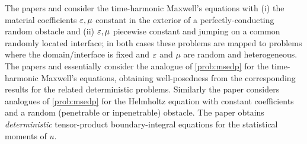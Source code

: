 The papers \cite{JeScZe:17} and \cite{JeSc:16} consider the time-harmonic Maxwell's equations with (i) the material coefficients $\varepsilon,\mu$ constant in the exterior of a perfectly-conducting random obstacle and (ii) $\varepsilon,\mu$ piecewise constant and jumping on a common randomly located interface; in both cases these problems are mapped to problems where the domain/interface is fixed and $\varepsilon$ and $\mu$ are random and heterogeneous. The papers \cite{JeScZe:17} and \cite{JeSc:16} essentially consider the analogue of \cref{prob:msedp} for the time-harmonic Maxwell's equations, obtaining well-posedness from the corresponding results for the related deterministic problems. Similarly the paper \cite{EsJe:19} considers analogues of \cref{prob:msedp} for the Helmholtz equation with constant coefficients and a random (penetrable or inpenetrable) obstacle. The paper \cite{EsJe:19} obtains \emph{deterministic} tensor-product boundary-integral equations for the statistical moments of $u.$
